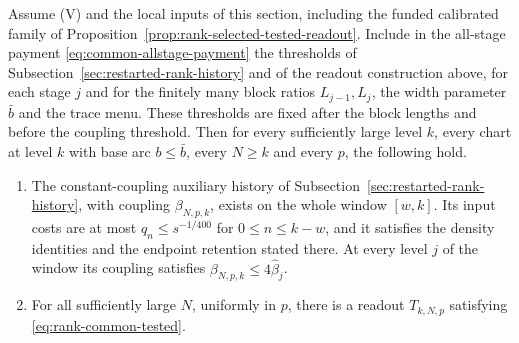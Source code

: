 \begin{proposition}
\label{prop:rank-trace-chart-window}
Assume (V) and the local inputs of this section, including the funded
calibrated family of Proposition~\ref{prop:rank-selected-tested-readout}. Include in the
all-stage payment \eqref{eq:common-allstage-payment} the thresholds of
Subsection~\ref{sec:restarted-rank-history} and of the readout construction
above, for each stage $j$ and for the finitely many block ratios
$L_{j-1},L_j$, the width parameter $\bar b$ and the trace menu. These
thresholds are fixed after the block lengths and before the coupling
threshold. Then for every sufficiently large level $k$, every chart at
level $k$ with base arc $b\le\bar b$, every $N\ge k$ and every $p$, the
following hold.
\begin{enumerate}
\item The constant-coupling auxiliary history of
 Subsection~\ref{sec:restarted-rank-history}, with coupling
 $\beta_{N,p,k}$, exists on the whole window $[w,k]$. Its input costs are
 at most $q_n\le s^{-1/400}$ for $0\le n\le k-w$, and it satisfies the
 density identities and the endpoint retention stated there. At every
 level $j$ of the window its coupling satisfies
 $\beta_{N,p,k}\le4\widehat\beta_j$.
\item For all sufficiently large $N$, uniformly in $p$, there is a readout
 $T_{k,N,p}$ satisfying \eqref{eq:rank-common-tested}.
\end{enumerate}
\end{proposition}
